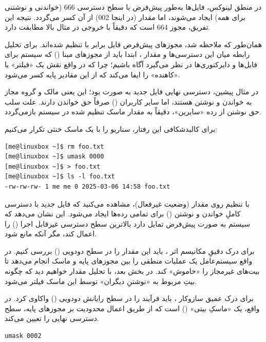 در منطق لینوکس، فایل‌ها به‌طور پیش‌فرض با سطح دسترسی 666 (خواندنی و نوشتنی برای همه) ایجاد می‌شوند، اما مقدار  (در اینجا 002) از آن کسر می‌گردد. نتیجه این تفریق، مجوز 664 است که دقیقاً با خروجی  در مثال بالا مطابقت دارد.

همان‌طور که ملاحظه شد، مجوزهای پیش‌فرض فایل برابر با  تنظیم شده‌اند. برای تحلیل رابطه میان این دسترسی‌ها و مقدار ، ابتدا باید از مجوزهای مبنا () که سیستم برای فایل‌ها و دایرکتوری‌ها در نظر می‌گیرد آگاه باشیم؛ چرا که  در واقع نقش یک «فیلتر» یا «کاهنده» را ایفا می‌کند که از این مقادیر پایه کسر می‌شود.

در مثال پیشین، دسترسی نهایی فایل جدید به صورت  بود؛ این یعنی مالک و گروه مجاز به خواندن و نوشتن هستند، اما سایر کاربران () صرفاً حق خواندن دارند. علت سلب حق نوشتن از رده «سایرین»، دقیقاً به مقدار ماسک تنظیم شده در سیستم بازمی‌گردد.

برای کالبدشکافی این رفتار، سناریو را با یک ماسک خنثی تکرار می‌کنیم:

\begin{latin}
\begin{lstlisting}
[me@linuxbox ~]$ rm foo.txt
[me@linuxbox ~]$ umask 0000
[me@linuxbox ~]$ > foo.txt
[me@linuxbox ~]$ ls -l foo.txt
-rw-rw-rw- 1 me me 0 2025-03-06 14:58 foo.txt
\end{lstlisting}
\end{latin}

با تنظیم  روی مقدار  (وضعیت غیرفعال)، مشاهده می‌کنید که فایل جدید با دسترسی کاملِ خواندن و نوشتن () برای تمامی رده‌ها ایجاد می‌شود. این نشان می‌دهد که سیستم به صورت پیش‌فرض تمایل دارد بالاترین سطح دسترسی غیرقابل اجرا () را اعمال کند، مگر آنکه  مانع شود.

برای درک دقیقِ مکانیسم اثر ، باید این مقدار را در سطح دودویی () بررسی کنیم. در واقع سیستم‌عامل یک عملیات منطقی  را بین مجوزهای پایه و ماسک انجام می‌دهد تا بیت‌های غیرمجاز را «خاموش» کند. در بخش بعد، با تحلیل مقدار  خواهیم دید که چگونه بیتِ مربوط به «نوشتنِ دیگران» توسط این ماسک فیلتر می‌شود.

برای درک عمیق سازوکار ، باید فرآیند را در سطح رایانش دودویی () واکاوی کرد. در واقع،  یک «ماسکِ بیتی» () است که از طریق اعمال محدودیت بر مجوزهای پایه، سطح دسترسی نهایی را تعیین می‌کند.

\begin{latin}
\begin{lstlisting}
umask 0002
\end{lstlisting}
\end{latin}

